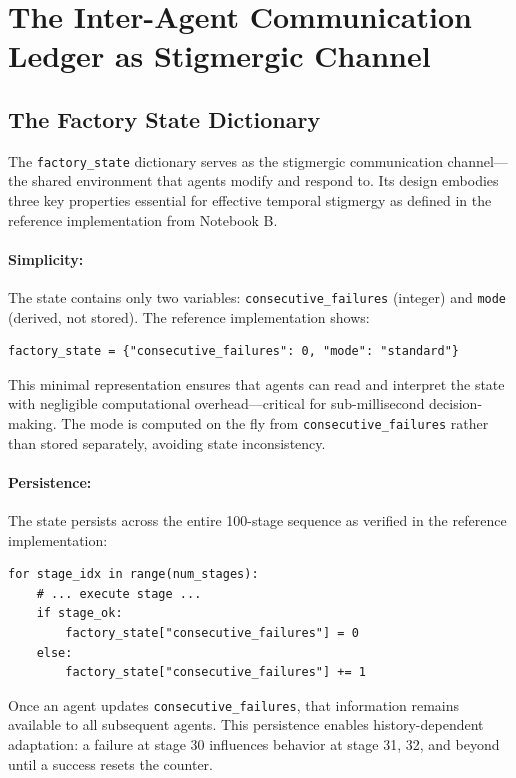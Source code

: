 \documentclass[12pt,a4paper,oneside]{report}
\begin{document}
\section{The Inter-Agent Communication Ledger as Stigmergic Channel}

\subsection{The Factory State Dictionary}

The \texttt{factory\_state} dictionary serves as the stigmergic communication channel—the shared environment that agents modify and respond to. Its design embodies three key properties essential for effective temporal stigmergy as defined in the reference implementation from Notebook B.

\paragraph{Simplicity:} The state contains only two variables: \texttt{consecutive\_failures} (integer) and \texttt{mode} (derived, not stored). The reference implementation shows:

\begin{verbatim}
factory_state = {"consecutive_failures": 0, "mode": "standard"}
\end{verbatim}

This minimal representation ensures that agents can read and interpret the state with negligible computational overhead—critical for sub-millisecond decision-making. The mode is computed on the fly from \texttt{consecutive\_failures} rather than stored separately, avoiding state inconsistency.

\paragraph{Persistence:} The state persists across the entire 100-stage sequence as verified in the reference implementation:

\begin{verbatim}
for stage_idx in range(num_stages):
    # ... execute stage ...
    if stage_ok:
        factory_state["consecutive_failures"] = 0
    else:
        factory_state["consecutive_failures"] += 1
\end{verbatim}

Once an agent updates \texttt{consecutive\_failures}, that information remains available to all subsequent agents. This persistence enables history-dependent adaptation: a failure at stage 30 influences behavior at stage 31, 32, and beyond until a success resets the counter.
\end{document}

